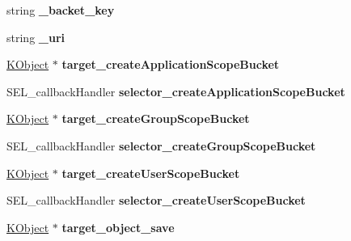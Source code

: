 \begin{DoxyCompactItemize}
\item 
\hypertarget{class_c_kii_bucket_ae62e874439f55143f8009f88da23bc99}{string {\bfseries \-\_\-backet\-\_\-key}}\label{class_c_kii_bucket_ae62e874439f55143f8009f88da23bc99}

\item 
\hypertarget{class_c_kii_bucket_aa18c6b0053f2e0a2a07c33e5dc490802}{string {\bfseries \-\_\-uri}}\label{class_c_kii_bucket_aa18c6b0053f2e0a2a07c33e5dc490802}

\item 
\hypertarget{class_c_kii_bucket_abb9c612afef7908a3e03f302aba20480}{\hyperlink{class_k_object}{K\-Object} $\ast$ {\bfseries target\-\_\-create\-Application\-Scope\-Bucket}}\label{class_c_kii_bucket_abb9c612afef7908a3e03f302aba20480}

\item 
\hypertarget{class_c_kii_bucket_a4a5b74eb7eea8c621668c2cd8a5f7cb4}{S\-E\-L\-\_\-callback\-Handler {\bfseries selector\-\_\-create\-Application\-Scope\-Bucket}}\label{class_c_kii_bucket_a4a5b74eb7eea8c621668c2cd8a5f7cb4}

\item 
\hypertarget{class_c_kii_bucket_a262c5942c6c5cc86abb3c4e62d0ea98c}{\hyperlink{class_k_object}{K\-Object} $\ast$ {\bfseries target\-\_\-create\-Group\-Scope\-Bucket}}\label{class_c_kii_bucket_a262c5942c6c5cc86abb3c4e62d0ea98c}

\item 
\hypertarget{class_c_kii_bucket_a0070b496c90629e11bd409d7fe28cbda}{S\-E\-L\-\_\-callback\-Handler {\bfseries selector\-\_\-create\-Group\-Scope\-Bucket}}\label{class_c_kii_bucket_a0070b496c90629e11bd409d7fe28cbda}

\item 
\hypertarget{class_c_kii_bucket_ac35f08bfe1508ca0095b5e3ee6bbb6fb}{\hyperlink{class_k_object}{K\-Object} $\ast$ {\bfseries target\-\_\-create\-User\-Scope\-Bucket}}\label{class_c_kii_bucket_ac35f08bfe1508ca0095b5e3ee6bbb6fb}

\item 
\hypertarget{class_c_kii_bucket_ab596059653bc65a47a98f7dfbbd3f55c}{S\-E\-L\-\_\-callback\-Handler {\bfseries selector\-\_\-create\-User\-Scope\-Bucket}}\label{class_c_kii_bucket_ab596059653bc65a47a98f7dfbbd3f55c}

\item 
\hypertarget{class_c_kii_bucket_a2dc55c811e95dc321e1cb95f1dae0adf}{\hyperlink{class_k_object}{K\-Object} $\ast$ {\bfseries target\-\_\-object\-\_\-save}}\label{class_c_kii_bucket_a2dc55c811e95dc321e1cb95f1dae0adf}


\end{DoxyCompactItemize}
